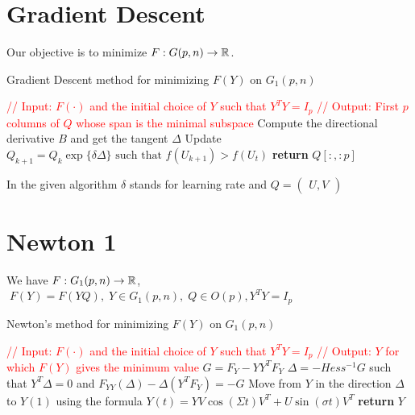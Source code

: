 \documentclass[11pt,a4paper]{report}
\begin{document}
\section{Gradient Descent}
Our objective is to minimize $F: G(p,n) \to \mathbb{R}$. \newline
\begin{algorithm}
\caption{Gradient Descent method for minimizing $F(Y)$ on $G_1(p,n)$ }\label{alg:gradG}
    \begin{algorithmic}[1]
        \State \textcolor{red}{// Input: $F(\cdot)$ and the initial choice of $Y$ such that $Y^T Y = I_p$}
        \State \textcolor{red}{// Output: First $p$ columns of $Q$ whose span is the minimal subspace}
        \State Compute the directional derivative $B$ and get the tangent $\Delta$
        \State
        \State Update $Q_{k+1} = Q_{k} \exp\{ \delta \Delta \} \text{ such that } f(U_{k+1}) > f(U_t)$
        \EndWhile
        \State \textbf{return} $Q[:,:p]$
        \EndProcedure
    \end{algorithmic}
\end{algorithm}
In the given algorithm $\delta$ stands for learning rate and $Q = \begin{pmatrix} U,V \end{pmatrix}$
\newpage
\section{Newton 1}
We have $F: G_1(p,n) \to \mathbb{R} $, $ \; F(Y) = F(YQ), \; Y \in G_1(p,n), \; Q \in O(p), Y^T Y = I_p$
\begin{algorithm}
\caption{Newton's method for minimizing $F(Y)$ on $G_1(p,n)$ }\label{alg:quotAlg}
    \begin{algorithmic}[1]
        \State \textcolor{red}{// Input: $F(\cdot)$ and the initial choice of $Y$ such that $Y^T Y = I_p$}
        \State \textcolor{red}{// Output: $Y$ for which $F(Y)$ gives the minimum value}
        \State $G = F_Y - Y Y^T F_Y$
        \State $\Delta = -Hess^{-1} G$ such that $Y^T \Delta = 0$ and $F_{YY}(\Delta) - \Delta(Y^T F_Y) = -G$
        \State
        \State Move from $Y$ in the direction $\Delta$ to $Y(1)$ using the formula 
        \State $Y(t) = Y V \cos(\Sigma t) V^T + U \sin(\sigma t) V^T$ 
        \EndWhile
        \State \textbf{return} $Y$
        \EndProcedure
    \end{algorithmic}
\end{algorithm}
\end{document}
